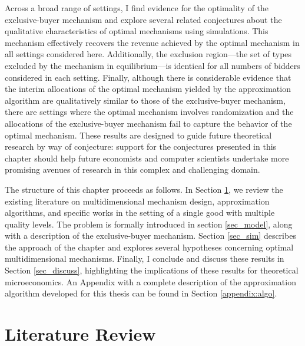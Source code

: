 Across a broad range of settings, I find evidence for the optimality of the exclusive-buyer mechanism and explore several related conjectures about the qualitative characteristics of optimal mechanisms using simulations. This mechanism effectively recovers the revenue achieved by the optimal mechanism in all settings considered here. Additionally, the exclusion region---the set of types excluded by the mechanism in equilibrium---is identical for all numbers of bidders considered in each setting. Finally, although there is considerable evidence that the interim allocations of the optimal mechanism yielded by the approximation algorithm are qualitatively similar to those of the exclusive-buyer mechanism, there are settings where the optimal mechanism involves randomization and the allocations of the exclusive-buyer mechanism fail to capture the behavior of the optimal mechanism. These results are designed to guide future theoretical research by way of conjecture: support for the conjectures presented in this chapter should help future economists and computer scientists undertake more promising avenues of research in this complex and challenging domain.

The structure of this chapter proceeds as follows. In Section \ref{sec_litreview}, we review the existing literature on multidimensional mechanism design, approximation algorithms, and specific works in the setting of a single good with multiple quality levels. The problem is formally introduced in section \ref{sec_model}, along with a description of the exclusive-buyer mechanism. Section \ref{sec_sim} describes the approach of the chapter and explores several hypotheses concerning optimal multidimensional mechanisms. Finally, I conclude and discuss these results in Section \ref{sec_discuss}, highlighting the implications of these results for theoretical microeconomics. An Appendix with a complete description of the approximation algorithm developed for this thesis can be found in Section \ref{appendix:algo}.








\section{Literature Review}\label{sec_litreview}

